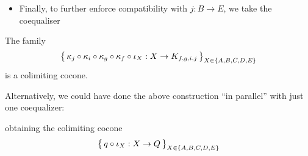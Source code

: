 \begin{itemize}
\item
  Finally, to further enforce compatibility with $j:B\to E$, we take the
  coequaliser 
  \begin{center}\end{center}
\end{itemize}
The family 
\[
  \big\{ \,
  \kappa_j\circ\kappa_i\circ\kappa_g\circ\kappa_f\circ\iota_X 
  : X\to K_{f,g,i,j}
  \, \big\}_{X\in\{ A,B,C,D,E \}}
\]
is a colimiting cocone.

Alternatively, we could have done the above construction ``in parallel'' with
just one coequalizer:
\begin{center}\end{center}
obtaining the colimiting cocone
\[
  \big\{ \, q\circ\iota_X : X\to Q \, \big\}_{X\in\{ A,B,C,D,E \}}
\]

